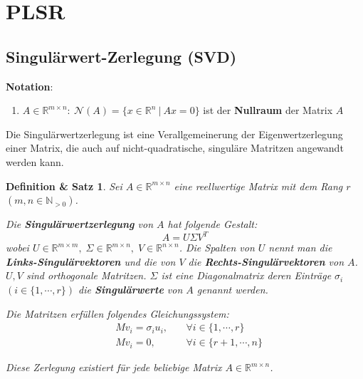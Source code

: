 \documentclass{article}
\newcommand{\R}[0]{\mathbb{R}}
\newtheorem{definthm}{Definition \& Satz}
\begin{document}
\cite[S. 61ff.]{richter2021inverse}

\section{PLSR}

\subsection{Singulärwert-Zerlegung (SVD)}
\textbf{Notation}:
\begin{enumerate}
    \item $A \in \R^{m \times n}: \: \mathcal{N}(A) = \{x \in \R^n \: | \: Ax = 0\}$ ist der \textbf{Nullraum} der Matrix $A$
\end{enumerate}

Die Singulärwertzerlegung ist eine Verallgemeinerung der Eigenwertzerlegung einer Matrix, die auch auf nicht-quadratische, singuläre Matritzen angewandt werden kann.

\begin{definthm}
    Sei $A \in \R^{m \times n}$ eine reellwertige Matrix mit dem Rang $r$ $(m,n \in \mathbb{N}_{>0})$.

    Die \textbf{Singulärwertzerlegung} von $A$  hat folgende Gestalt:
    \begin{equation}
        A = U \Sigma V^T
    \end{equation}
    wobei $U \in \R^{m \times m}, \; \Sigma \in \R^{m \times n}, \; V \in \R^{n \times n}$.
    Die Spalten von $U$ nennt man die \textbf{Links-Singulärvektoren} und die von $V$ die \textbf{Rechts-Singulärvektoren} von $A$. $U, V$ sind orthogonale Matritzen.
    $\Sigma$ ist eine Diagonalmatrix deren Einträge $\sigma_i$ $(i \in \{1, \cdots, r\})$ die \textbf{Singulärwerte} von $A$ genannt werden.
    
    Die Matritzen erfüllen folgendes Gleichungssystem:
    \begin{align}
        &Mv_i = \sigma_i u_i, \:&&\forall i \in \{1, \cdots, r\} \\
        &Mv_i = 0, \: &&\forall i \in \{r + 1, \cdots, n\}
    \end{align}

    Diese Zerlegung existiert für jede beliebige Matrix $A \in \R^{m \times n}$.
\end{definthm}
\end{document}
